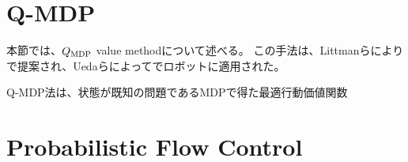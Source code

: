 \section{Q-MDP}
本節では、$Q_{\rm MDP}$ value methodについて述べる。
この手法は、Littmanらにより\cite{littman1995}で提案され、Uedaらによって\cite{}でロボットに適用された。

Q-MDP法は、状態が既知の問題であるMDPで得た最適行動価値関数


\section{Probabilistic Flow Control} \label{section:PFC法}
